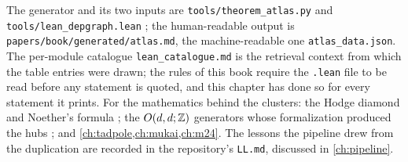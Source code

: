 The generator and its two inputs are \texttt{tools/theorem\_atlas.py}
 and \texttt{tools/lean\_depgraph.lean}
; the human-readable output is
\texttt{papers/book/generated/atlas.md}, the machine-readable one
\texttt{atlas\_data.json}. The per-module catalogue \texttt{lean\_catalogue.md} is the
retrieval context from which the table entries were drawn; the rules of this book require
the \texttt{.lean} file to be read before any statement is quoted, and this chapter has
done so for every statement it prints. For the mathematics behind the clusters: the Hodge
diamond and Noether's formula ; the $O(d,d;\mathbb{Z})$ generators
whose formalization produced the hubs ; and
\cref{ch:tadpole,ch:mukai,ch:m24}. The lessons the pipeline drew from the duplication are
recorded in the repository's \texttt{LL.md}, discussed in \cref{ch:pipeline}.
